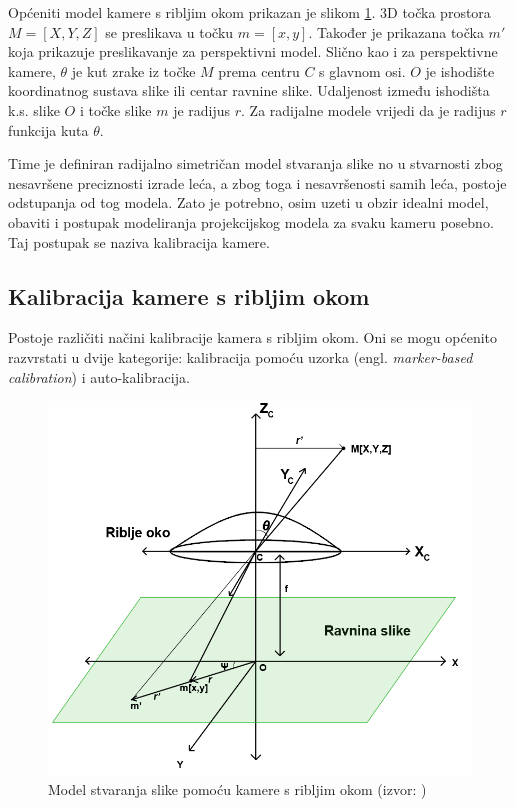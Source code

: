 \documentclass[../seminar.tex]{subfiles}
\begin{document}
Općeniti model kamere s ribljim okom prikazan je slikom \ref{fig:fisheye_model}. 
3D točka prostora $M = [X, Y, Z]$ se preslikava u točku $m = [x, y]$. Također je prikazana točka $m'$ koja prikazuje preslikavanje za perspektivni model. Slično kao i za perspektivne kamere, $\theta$ je kut zrake iz točke $M$ prema centru $C$ s glavnom osi. $O$ je ishodište koordinatnog sustava slike ili centar ravnine slike. Udaljenost između ishodišta k.s. slike  $O$ i točke slike $m$ je radijus $r$. Za radijalne modele vrijedi da je radijus $r$ funkcija kuta $\theta$. 

Time je definiran radijalno simetričan model stvaranja slike no u stvarnosti zbog nesavršene preciznosti izrade leća, a zbog toga i nesavršenosti samih leća, postoje odstupanja od tog modela. Zato je potrebno, osim uzeti u obzir idealni model, obaviti i postupak modeliranja projekcijskog modela za svaku kameru posebno. Taj postupak se naziva kalibracija kamere.
\clearpage

\subsection{Kalibracija kamere s ribljim okom}

Postoje različiti načini kalibracije kamera s ribljim okom. Oni se mogu općenito razvrstati u dvije kategorije: kalibracija pomoću uzorka (engl. \textit{marker-based calibration}) i auto-kalibracija. 

\begin{figure}[ht!]
  \centering
    \includegraphics[width=.7\textwidth]{img_003_fisheye_model_01_small.png}
   \caption{Model stvaranja slike pomoću kamere s ribljim okom (izvor: \cite{Kashyap})}
  \label{fig:fisheye_model}
\end{figure}
\end{document}
